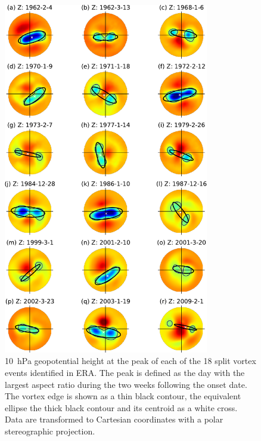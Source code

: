 \begin{figure}[htbp]
 \centering
 \noindent\includegraphics[width=0.8\textwidth]{figures/chapter-moments/GPH_all_events_splits.pdf}
 \caption[Geopotential height at the peak of split vortex events.]{10~hPa
   geopotential height at the peak of each of the 18 split vortex events
   identified in ERA. The peak is defined as the day with the largest aspect
   ratio during the two weeks following the onset date. The vortex edge is shown
   as a thin black contour, the equivalent ellipse the thick black contour and
   its centroid as a white cross. Data are transformed to Cartesian coordinates
   with a polar stereographic projection.}
 \label{fig:gph_all_events_splits}
\end{figure}

